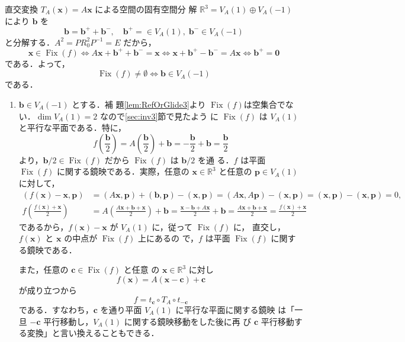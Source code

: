 \documentclass[11pt, uplatex, dvipdfmx, titlepage]{jsarticle}
\makeatletter
\DeclareMathOperator{\Fix}{Fix}
\renewenvironment{proof}[1][\proofname]{\par
  \pushQED{\qed}%
  \normalfont \topsep6\p@\@plus6\p@\relax
  \trivlist
  \item[\hskip\labelsep
         \bfseries
    {#1}]\ignorespaces
}{%
  \popQED\endtrivlist\@endpefalse
}
\theoremstyle{definition}
\renewcommand{\proofname}{\textbf{証明}}
\makeatother
\begin{document}
\begin{proof}
  直交変換 $T_A(\bm{x}) = A\bm{x}$ による空間の固有空間分
  解 $\mathbb{R}^3 = V_A(1) \oplus V_A(-1)$ により $\bm{b}$ を
\[
  \bm{b} = \bm{b}^{+} + \bm{b}^{-}, \quad \bm{b}^{+} =  \in V_A(1), \; \bm{b}^{-}  \in V_A(-1)
\]
と分解する．$A^2= PR_0^2P^{-1}=E$ だから，
\[
  \bm{x} \in \Fix(f) \Leftrightarrow A\bm{x} + \bm{b}^{+}+ \bm{b}^{-} = \bm{x} \Leftrightarrow
  \bm{x} + \bm{b}^{+}-\bm{b}^{-}=A\bm{x} \Leftrightarrow
  \bm{b}^{+} = \bm{0}
\]
である．よって，
\[
  \Fix(f) \neq \emptyset \Leftrightarrow \bm{b} \in V_A(-1)
\]
である．
\end{proof}

\begin{proof}[定理\ref{thm:RefOrGlide3}の証明]
  
  \begin{enumerate}[(1)]
  \item $\bm{b} \in V_A(-1)$ とする．補
    題\ref{lem:RefOrGlide3}より $\Fix(f)$は空集合でない．$\dim
    V_A(1)=2$ なので\ref{sec:inv3}節で見たよう
    に $\Fix(f)$ は $V_A(1)$ と平行な平面である．特に，
    \[
      f\left(\frac{\bm{b}}{2}\right) = A\left(\frac{\bm{b}}{2}\right)
      + \bm{b} = -\frac{\bm{b}}{2} + \bm{b} = \frac{\bm{b}}{2}
    \]
    より，$\bm{b}/2 \in \Fix(f)$ だから $\Fix(f)$ は $\bm{b}/2$ を通
    る．$f$ は平面 $\Fix(f)$ に関する鏡映である．実際，任意の $\bm{x}
    \in \mathbb{R}^3$ と任意の $\bm{p} \in V_A(1)$ に対して，
    \begin{align*}
      \left(f(\bm{x})-\bm{x}, \bm{p}\right) &= (A\bm{x}, \bm{p}) + (\bm{b},\bm{p}) - (\bm{x},\bm{p})
      =(A\bm{x}, A\bm{p}) - (\bm{x}, \bm{p}) = (\bm{x}, \bm{p}) - (\bm{x}, \bm{p}) =0,\\
      f\left(\frac{f(\bm{x})+\bm{x}}{2}\right) &= A\left( \frac{A\bm{x}+\bm{b}+\bm{x}}{2}\right)+\bm{b}
      = \frac{\bm{x}-\bm{b}+A\bm{x}}{2} + \bm{b} 
      = \frac{A\bm{x}+\bm{b}+\bm{x}}{2} = \frac{f(\bm{x})+\bm{x}}{2}
    \end{align*}
    であるから，$f(\bm{x})-\bm{x}$ が $V_A(1)$ に，従って $\Fix(f)$ に，
    直交し，$f(\bm{x})$ と $\bm{x}$ の中点が $\Fix(f)$ 上にあるの
    で，$f$ は平面 $\Fix(f)$ に関する鏡映である．



    また，任意の $\bm{c} \in \Fix(f)$ と任意
    の $\bm{x} \in \mathbb{R}^3$ に対し
    \[
      f(\bm{x}) = A(\bm{x}-\bm{c}) + \bm{c}
    \]
    が成り立つから
    \[
      f=t_{\bm{c}} \circ T_A \circ t_{-\bm{c}}
    \]
    である．すなわち，$\bm{c}$ を通り平面 $V_A(1)$ に平行な平面に関する鏡映
    は「一旦 $-\bm{c}$ 平行移動し，$V_A(1)$ に関する鏡映移動をした後に再
    び $\bm{c}$ 平行移動する変換」と言い換えることもできる．


\end{enumerate}
\end{proof}
\end{document}
